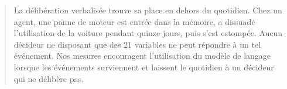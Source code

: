 \begin{abstract}
La délibération verbalisée trouve sa place en dehors du quotidien. Chez un agent, une panne de moteur est entrée dans la mémoire, a dissuadé l'utilisation de la voiture pendant quinze jours, puis s'est estompée. Aucun décideur ne disposant que des 21 variables ne peut répondre à un tel événement. Nos mesures encouragent l'utilisation du modèle de langage lorsque les événements surviennent et laissent le quotidien à un décideur qui ne délibère pas.
\end{abstract}
